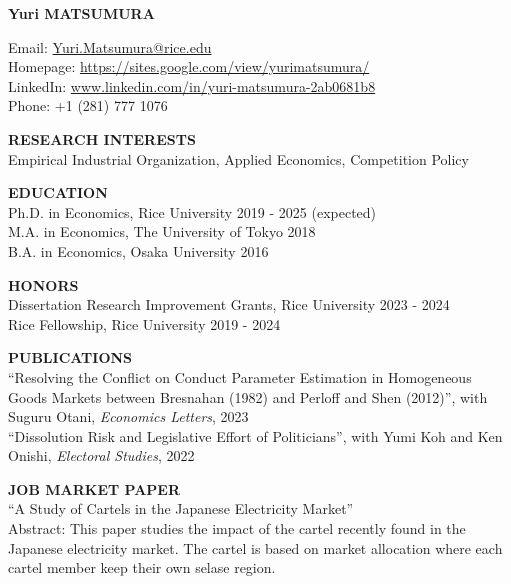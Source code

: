 \documentclass[10pt]{article}
\begin{document}
\begin{center}
    {\LARGE \textbf{Yuri MATSUMURA}} \\
\end{center}

\vspace{1mm}
Email: \href{mailto:Yuri.Matsumura@rice.edu}{Yuri.Matsumura@rice.edu} \\
Homepage: \href{https://sites.google.com/view/yurimatsumura/}{https://sites.google.com/view/yurimatsumura/} \\
LinkedIn: \href{https://www.linkedin.com/in/yuri-matsumura-2ab0681b8}{www.linkedin.com/in/yuri-matsumura-2ab0681b8} \\
Phone: +1 (281) 777 1076

\vspace{10pt}

\textbf{RESEARCH INTERESTS} \\
Empirical Industrial Organization, Applied Economics, Competition Policy

\vspace{10pt}

\textbf{EDUCATION} \\
Ph.D. in Economics, Rice University \hfill 2019 - 2025 (expected) \\
M.A. in Economics, The University of Tokyo \hfill 2018 \\
B.A. in Economics, Osaka University \hfill 2016

\vspace{10pt}

\textbf{HONORS} \\
Dissertation Research Improvement Grants, Rice University \hfill 2023 - 2024 \\
Rice Fellowship, Rice University \hfill 2019 - 2024

\vspace{10pt}

\textbf{PUBLICATIONS} \\
“Resolving the Conflict on Conduct Parameter Estimation in Homogeneous Goods Markets between Bresnahan (1982) and Perloff and Shen (2012)”, with Suguru Otani, \textit{Economics Letters}, 2023 \\
“Dissolution Risk and Legislative Effort of Politicians”, with Yumi Koh and Ken Onishi, \textit{Electoral Studies}, 2022

\vspace{10pt}

\textbf{JOB MARKET PAPER}\\
“A Study of Cartels in the Japanese Electricity Market”\\
Abstract: This paper studies the impact of the cartel recently found in the Japanese electricity market. The cartel is based on market allocation where each cartel member keep their own selase region.
\end{document}
